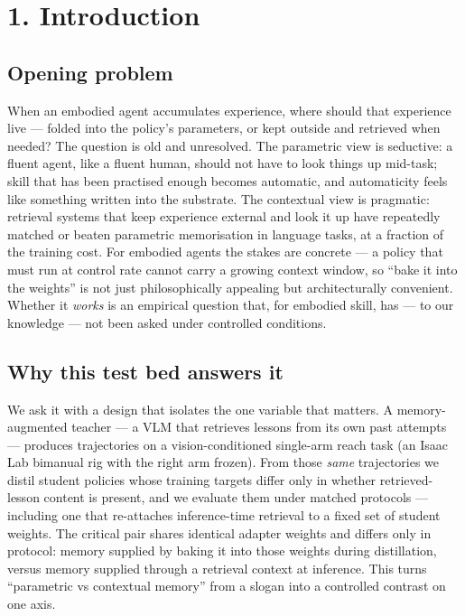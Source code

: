 \section*{1. Introduction}

\subsection*{Opening problem}

When an embodied agent accumulates experience, where should that
experience live --- folded into the policy's parameters, or kept outside
and retrieved when needed? The question is old and unresolved. The
parametric view is seductive: a fluent agent, like a fluent human,
should not have to look things up mid-task; skill that has been
practised enough becomes automatic, and automaticity feels like
something written into the substrate. The contextual view is
pragmatic: retrieval systems that keep experience external and look it
up have repeatedly matched or beaten parametric memorisation in
language tasks, at a fraction of the training cost. For embodied agents
the stakes are concrete --- a policy that must run at control rate cannot
carry a growing context window, so ``bake it into the weights'' is not
just philosophically appealing but architecturally convenient. Whether
it \emph{works} is an empirical question that, for embodied skill, has --- to
our knowledge --- not been asked under controlled conditions.

\subsection*{Why this test bed answers it}

We ask it with a design that isolates the one variable that matters. A
memory-augmented teacher --- a VLM that retrieves lessons from its own
past attempts --- produces trajectories on a vision-conditioned
single-arm reach task (an Isaac Lab bimanual rig with the right arm
frozen). From those \emph{same} trajectories we distil student policies
whose training targets differ only in whether retrieved-lesson content
is present, and we evaluate them under matched protocols --- including
one that re-attaches inference-time retrieval to a fixed set of student
weights. The critical pair shares identical adapter weights and differs
only in protocol: memory supplied by baking it into those weights
during distillation, versus memory supplied through a retrieval context
at inference. This turns ``parametric vs contextual memory'' from a
slogan into a controlled contrast on one axis.

